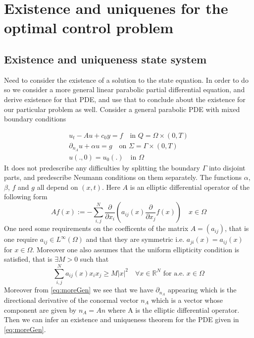\section{Existence and uniquenes for the optimal control problem}\label{proof}

\subsection{Existence and uniqueness state system}
Need to consider the existence of a solution to the state equation. In order to do so we consider a more general linear parabolic partial differential equation, and derive existence for that PDE, and use that to conclude about the existence for our particular problem as well. Consider a general parabolic PDE with mixed boundary conditions

\begin{align}
    \label{eq:moreGen}
    u_t - Au + c_0 y = f \quad \text{in } Q = \Omega \times (0,T) \\
    \partial_{n_A} u + \alpha u = g \quad \text{on } \Sigma = \Gamma \times (0,T) \\
    u(.,0) = u_0(.) \quad \text{in } \Omega
\end{align}
It does not predescribe any difficulties by splitting the boundary $\Gamma$ into disjoint parts, and predescribe Neumann conditions on them separately. The functions $\alpha$, $\beta$, $f$ and $g$ all depend on $(x,t)$. Here $A$ is an elliptic differential operator of the following form
%
\begin{equation*}
    Af(x) := -\sum_{i,j}^N\frac{\partial}{\partial x_i}(a_{ij}(x)\frac{\partial}{\partial x_j}f(x)) \quad x\in \Omega
\end{equation*}
One need some requirements on the coefficents of the matrix $A=(a_{ij})$, that is one require $a_{ij} \in L^{\infty}(\Omega)$ and that they are symmetric i.e. $a_{ji}(x) = a_{ij}(x)$ for $x\in \Omega$. Moreover one also assumes that the uniform ellipticity condition is satisfied, that is $\exists M>0$ such that 
\begin{equation*}
    \label{eq:uniformEl}
    \sum_{i,j}^N a_{ij}(x)x_i x_j \geq M|x|^2 \quad \forall x \in \mathbb{R}^N \text{ for a.e. $x\in \Omega$}
\end{equation*}
Moreover from \eqref{eq:moreGen} we see that we have $\partial_{n_A}$ appearing which is the directional derivative of the conormal vector $n_{A}$ which is a vector whose component are given by $n_{A} = An$ where A is the elliptic differential operator. Then we can infer an existence and uniqueness theorem for the PDE given in \eqref{eq:moreGen}. 

